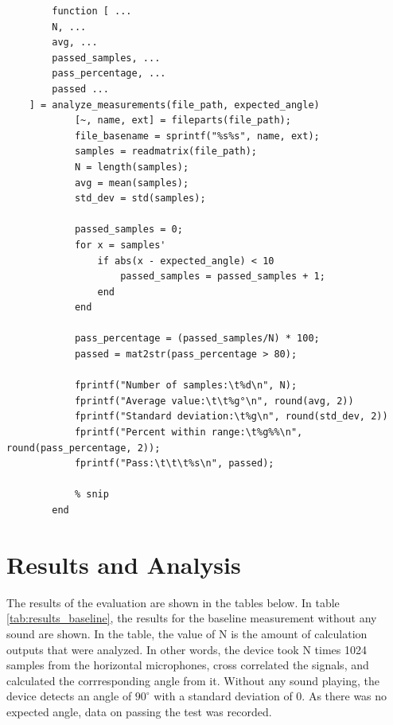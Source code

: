 \documentclass[a4paper]{article}
\begin{document}
\begin{listing}[H]
    \begin{verbatim}
        function [ ...
        N, ...
        avg, ...
        passed_samples, ...
        pass_percentage, ...
        passed ...
    ] = analyze_measurements(file_path, expected_angle) 
            [~, name, ext] = fileparts(file_path);
            file_basename = sprintf("%s%s", name, ext);
            samples = readmatrix(file_path);
            N = length(samples);
            avg = mean(samples);
            std_dev = std(samples);

            passed_samples = 0;
            for x = samples'
                if abs(x - expected_angle) < 10
                    passed_samples = passed_samples + 1;
                end 
            end

            pass_percentage = (passed_samples/N) * 100;
            passed = mat2str(pass_percentage > 80);

            fprintf("Number of samples:\t%d\n", N);
            fprintf("Average value:\t\t%g°\n", round(avg, 2))
            fprintf("Standard deviation:\t%g\n", round(std_dev, 2))
            fprintf("Percent within range:\t%g%%\n", round(pass_percentage, 2));
            fprintf("Pass:\t\t\t%s\n", passed);
            
            % snip
        end
    \end{verbatim}
        \caption{\texttt{analyze\textunderscore measurements.m} Matlab script}
        \label{list:analyze_measurements}
    \end{listing}
    
\section{Results and Analysis}

The results of the evaluation are shown in the tables below. In table \ref{tab:results_baseline}, the results for the baseline measurement without any sound are shown. In the table, the value of N is the amount of calculation outputs that were analyzed. In other words, the device took N times 1024 samples from the horizontal microphones, cross correlated the signals, and calculated the corrresponding angle from it. Without any sound playing, the device detects an angle of $90^{\circ}$ with a standard deviation of $0$. As there was no expected angle, data on passing the test was recorded.
\end{document}
